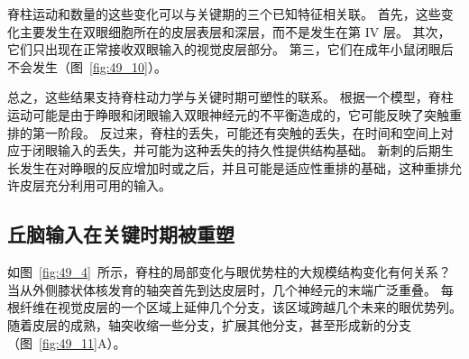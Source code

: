 脊柱运动和数量的这些变化可以与关键期的三个已知特征相关联。
首先，这些变化主要发生在双眼细胞所在的皮层表层和深层，而不是发生在第 IV 层。
其次，它们只出现在正常接收双眼输入的视觉皮层部分。
第三，它们在成年小鼠闭眼后不会发生（图~\ref{fig:49_10}）。


总之，这些结果支持脊柱动力学与关键时期可塑性的联系。
根据一个模型，脊柱运动可能是由于睁眼和闭眼输入双眼神经元的不平衡造成的，它可能反映了突触重排的第一阶段。
反过来，脊柱的丢失，可能还有突触的丢失，在时间和空间上对应于闭眼输入的丢失，并可能为这种丢失的持久性提供结构基础。
新刺的后期生长发生在对睁眼的反应增加时或之后，并且可能是适应性重排的基础，这种重排允许皮层充分利用可用的输入。



\subsection{丘脑输入在关键时期被重塑}

如图~\ref{fig:49_4}~所示，脊柱的局部变化与眼优势柱的大规模结构变化有何关系？
当从外侧膝状体核发育的轴突首先到达皮层时，几个神经元的末端广泛重叠。
每根纤维在视觉皮层的一个区域上延伸几个分支，该区域跨越几个未来的眼优势列。
随着皮层的成熟，轴突收缩一些分支，扩展其他分支，甚至形成新的分支（图~\ref{fig:49_11}A）。


